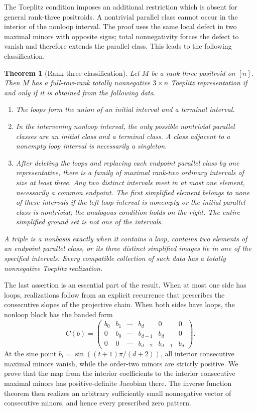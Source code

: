 \documentclass{amsart}
\numberwithin{equation}{section}
\newtheorem{theorem}{Theorem}
\theoremstyle{definition}
\theoremstyle{remark}
\begin{document}
The Toeplitz condition imposes an additional restriction which is absent for general rank-three positroids.  A nontrivial parallel class cannot occur in the interior of the nonloop interval.  The proof uses the same local defect in two maximal minors with opposite signs; total nonnegativity forces the defect to vanish and therefore extends the parallel class.  This leads to the following classification.

\begin{theorem}[Rank-three classification]\label{thm:intro-rank3}
Let $M$ be a rank-three positroid on $[n]$.  Then $M$ has a full-row-rank totally nonnegative $3\times n$ Toeplitz representation if and only if it is obtained from the following data.
\begin{enumerate}
\item The loops form the union of an initial interval and a terminal interval.
\item In the intervening nonloop interval, the only possible nontrivial parallel classes are an initial class and a terminal class.  A class adjacent to a nonempty loop interval is necessarily a singleton.
\item After deleting the loops and replacing each endpoint parallel class by one representative, there is a family of maximal rank-two ordinary intervals of size at least three.  Any two distinct intervals meet in at most one element, necessarily a common endpoint.  The first simplified element belongs to none of these intervals if the left loop interval is nonempty or the initial parallel class is nontrivial; the analogous condition holds on the right.  The entire simplified ground set is not one of the intervals.
\end{enumerate}
A triple is a nonbasis exactly when it contains a loop, contains two elements of an endpoint parallel class, or its three distinct simplified images lie in one of the specified intervals.  Every compatible collection of such data has a totally nonnegative Toeplitz realization.
\end{theorem}

The last assertion is an essential part of the result.  When at most one side has loops, realizations follow from an explicit recurrence that prescribes the consecutive slopes of the projective chain.  When both sides have loops, the nonloop block has the banded form
\[
 C(b)=
 \begin{pmatrix}
 b_0&b_1&\cdots&b_d&0&0\\
 0&b_0&\cdots&b_{d-1}&b_d&0\\
 0&0&\cdots&b_{d-2}&b_{d-1}&b_d
 \end{pmatrix}.
\]
At the sine point $b_t=\sin((t+1)\pi/(d+2))$, all interior consecutive maximal minors vanish, while the order-two minors are strictly positive.  We prove that the map from the interior coefficients to the interior consecutive maximal minors has positive-definite Jacobian there.  The inverse function theorem then realizes an arbitrary sufficiently small nonnegative vector of consecutive minors, and hence every prescribed zero pattern.
\end{document}
